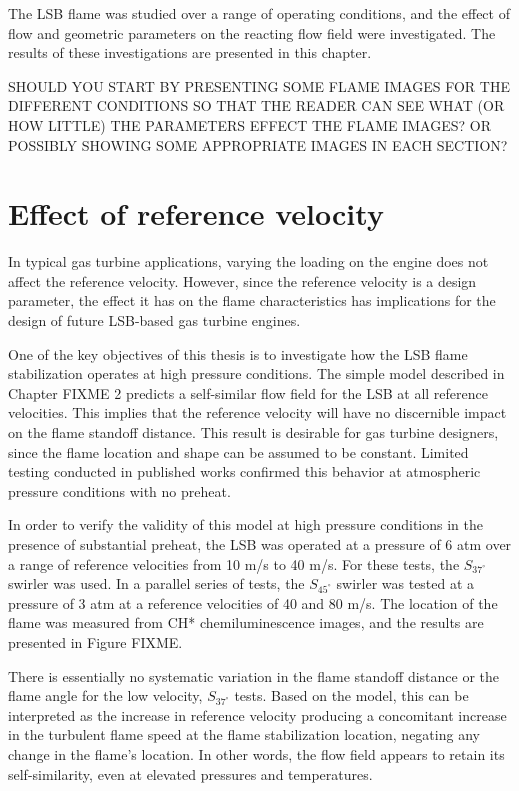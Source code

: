 The LSB flame was studied over a range of operating conditions, and the effect of flow and geometric parameters on the reacting flow field were investigated. The results of these investigations are presented in this chapter.

SHOULD YOU START BY PRESENTING SOME FLAME IMAGES FOR THE DIFFERENT CONDITIONS SO THAT THE READER CAN SEE WHAT (OR HOW LITTLE) THE  PARAMETERS EFFECT THE FLAME IMAGES? OR POSSIBLY SHOWING SOME APPROPRIATE IMAGES IN EACH SECTION?

\section{Effect of reference velocity}
\label{sec:refVelEffect}

In typical gas turbine applications, varying the loading on the engine does not affect the reference velocity.
However, since the reference velocity is a design parameter, the effect it has on the flame characteristics has implications for the design of future LSB-based gas turbine engines.

One of the key objectives of this thesis is to investigate how the LSB flame stabilization operates at high pressure conditions.
The simple model described in Chapter FIXME 2 predicts a self-similar flow field for the LSB at all reference velocities.
This implies that the reference velocity will have no discernible impact on the flame standoff distance.
This result is desirable for gas turbine designers, since the flame location and shape can be assumed to be constant.
Limited testing conducted in published works confirmed this behavior at atmospheric pressure conditions with no preheat.

In order to verify the validity of this model at high pressure conditions in the presence of substantial preheat, the LSB was operated at a pressure of 6 atm over a range of reference velocities from 10 m/s to 40 m/s. For these tests, the \(S_{37^\circ}\) swirler was used.
In a parallel series of tests, the \(S_{45^\circ}\) swirler was tested at a pressure of 3 atm at a reference velocities of 40 and 80 m/s.
The location of the flame was measured from CH* chemiluminescence images, and the results are presented in Figure FIXME.

There is essentially no systematic variation in the flame standoff distance or the flame angle for the low velocity, \(S_{37^\circ}\) tests.
Based on the model, this can be interpreted as the increase in reference velocity producing a concomitant increase in the turbulent flame speed at the flame stabilization location, negating any change in the flame's location.
In other words, the flow field appears to retain its self-similarity, even at elevated pressures and temperatures.

